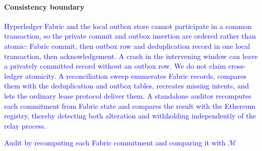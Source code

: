 \documentclass[final,5p,times,twocolumn]{elsarticle}
\begin{document}
\paragraph*{\textbf{Consistency boundary}}
\textcolor{blue}{Hyperledger Fabric and the local outbox store cannot participate in a common transaction, so the private commit and outbox insertion are ordered rather than atomic: Fabric commit, then outbox row and deduplication record in one local transaction, then acknowledgement. A crash in the intervening window can leave a privately committed record without an outbox row. We do not claim cross-ledger atomicity. A reconciliation sweep enumerates Fabric records, compares them with the deduplication and outbox tables, recreates missing intents, and lets the ordinary lease protocol deliver them. A standalone auditor recomputes each commitment from Fabric state and compares the result with the Ethereum registry, thereby detecting both alteration and withholding independently of the relay process.}

\begin{algorithm}[!htbp]
\scriptsize
\color{blue}
\caption{\textcolor{blue}{Pseudocode for lease-coordinated relay delivery and reconciliation}}
\label{alg:relay}
\KwResult{\textcolor{blue}{One durable public effect for every publishable committed record}}
\textcolor{blue}{Audit by recomputing each Fabric commitment and comparing it with $\mathcal{M}$}\;
\end{algorithm}
\end{document}
